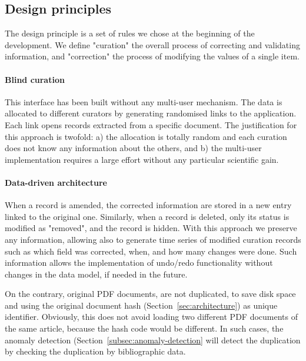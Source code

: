 \documentclass[a4paper]{article}
\begin{document}

\subsection{Design principles}
\label{subsec:design-principles}

The design principle is a set of rules we chose at the beginning of the development. We define "curation" the overall process of correcting and validating information, and "correction" the process of modifying the values of a single item. 

\paragraph{Blind curation}
This interface has been built without any multi-user mechanism. 
The data is allocated to different curators by generating randomised links to the application. Each link opens records extracted from a specific document. 
The justification for this approach is twofold: a) the allocation is totally random and each curation does not know any information about the others, and b) the multi-user implementation requires a large effort without any particular scientific gain. 

\paragraph{Data-driven architecture} When a record is amended, the corrected information are stored in a new entry linked to the original one. 
Similarly, when a record is deleted, only its status is modified as "removed", and the record is hidden. 
With this approach we preserve any information, allowing also to generate time series of modified curation records such as which field was corrected, when, and how many changes were done. 
Such information allows the implementation of undo/redo functionality without changes in the data model, if needed in the future. 

On the contrary, original PDF documents, are not duplicated, to save disk space and using the original document hash (Section~\ref{sec:architecture}) as unique identifier.
Obviously, this does not avoid loading two different PDF documents of the same article, because the hash code would be different. In such cases, the anomaly detection (Section~\ref{subsec:anomaly-detection} will detect the duplication by checking the duplication by bibliographic data. 
\end{document}

